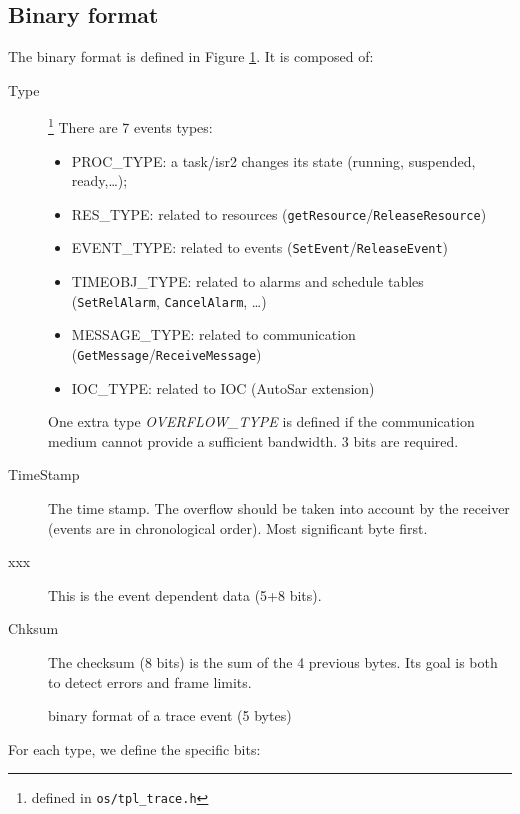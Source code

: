 \subsection{Binary format}
\label{sec:traceBinFormat}

The binary format is defined in Figure \ref{fig:traceBin}. It is composed of:
\begin{description}
	\item[Type]\footnote{defined in \lstinline{os/tpl_trace.h}} There are 7 events types: 
		\begin{itemize}
			\item PROC\_TYPE: a task/isr2 changes its state (running, suspended, ready,…);
			\item RES\_TYPE: related to resources (\lstinline{getResource}/\lstinline{ReleaseResource})
			\item EVENT\_TYPE: related to events (\lstinline{SetEvent}/\lstinline{ReleaseEvent})
			\item TIMEOBJ\_TYPE: related to alarms and schedule tables (\lstinline{SetRelAlarm}, \lstinline{CancelAlarm}, …)
			\item MESSAGE\_TYPE: related to communication (\lstinline{GetMessage}/\lstinline{ReceiveMessage})
			\item IOC\_TYPE: related to IOC (AutoSar extension) 
		\end{itemize}
		One extra type \emph{OVERFLOW\_TYPE} is defined if the communication medium cannot provide a sufficient bandwidth. 3 bits are required.
	\item[TimeStamp] The time stamp. The overflow should be taken into account by the receiver (events are in chronological order). Most significant byte first.
	\item[xxx] This is the event dependent data (5+8 bits).
	\item[Chksum] The checksum (8 bits) is the sum of the 4 previous bytes. Its goal is both to detect errors and frame limits.
\end{description}

\begin{figure}[htbp]
    \centering
	\begin{adjustbox}{width=.8\linewidth,keepaspectratio}
		
	\end{adjustbox}
	\caption{binary format of a trace event (5 bytes)}
	\label{fig:traceBin}
\end{figure}

For each type, we define the specific bits:

